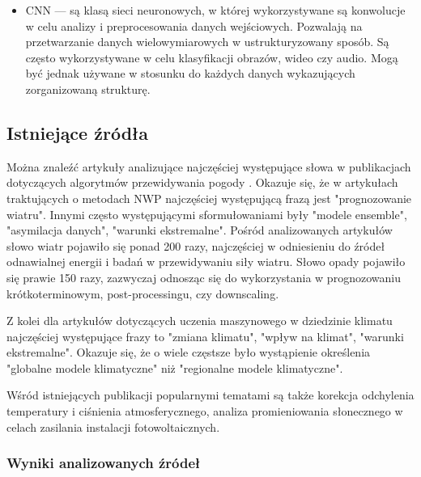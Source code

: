 \begin{itemize}
    \item CNN — są klasą sieci neuronowych, w której wykorzystywane są konwolucje w celu 
    analizy i preprocesowania danych wejściowych. Pozwalają na przetwarzanie danych wielowymiarowych
    w ustrukturyzowany sposób. Są często wykorzystywane w celu klasyfikacji obrazów, wideo czy
    audio. Mogą być jednak używane w stosunku do każdych danych wykazujących zorganizowaną strukturę.

\end{itemize}

\subsection{Istniejące źródła}

Można znaleźć artykuły analizujące najczęściej występujące słowa
w publikacjach dotyczących algorytmów przewidywania pogody 
\cite{ml-in-weather-prediction}. Okazuje się, że w artykułach traktujących o
metodach NWP najczęściej występującą frazą jest "prognozowanie wiatru". Innymi 
często występującymi sformułowaniami były "modele ensemble", "asymilacja danych",
"warunki ekstremalne". Pośród analizowanych artykułów słowo wiatr pojawiło się
ponad 200 razy, najczęściej w odniesieniu do źródeł odnawialnej energii i badań
w przewidywaniu siły wiatru. Słowo opady pojawiło się prawie 150 razy, zazwyczaj
odnosząc się do wykorzystania w prognozowaniu krótkoterminowym, post-processingu, czy
downscaling. 

Z kolei dla artykułów dotyczących uczenia maszynowego
w dziedzinie klimatu najczęściej występujące frazy to "zmiana klimatu", 
"wpływ na klimat", "warunki ekstremalne". Okazuje się, że o wiele częstsze było
wystąpienie określenia "globalne modele klimatyczne" niż "regionalne modele 
klimatyczne". 

Wśród istniejących publikacji popularnymi tematami są także korekcja odchylenia 
temperatury i ciśnienia atmosferycznego, analiza promieniowania słonecznego w celach
zasilania instalacji fotowoltaicznych.

\subsubsection*{Wyniki analizowanych źródeł}

